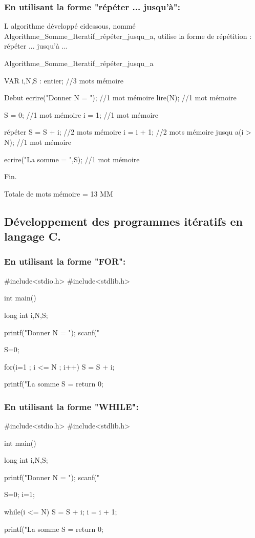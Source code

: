 \documentclass[•]{article}
\begin{document}
\subsubsection{En utilisant la forme "répéter ... jusqu'à":}
\textrm{L algorithme développé ci\-dessous, nommé Algorithme\_Somme\_Iteratif\_répéter\_jusqu\_a, utilise la forme de répétition : répéter ... jusqu'à ...}
\begin{sql}

  Algorithme_Somme_Iteratif_répéter_jusqu_a
 
 VAR
 i,N,S : entier;				//3 mots mémoire
 
 Debut
	ecrire("Donner N = ");		//1 mot mémoire
	lire(N);					//1 mot mémoire
	
	S = 0;						//1 mot mémoire
	i = 1;						//1 mot mémoire
	
	répéter
		S = S + i;				//2 mots mémoire
		i = i + 1;				//2 mots mémoire
	  jusqu a(i > N);			//1 mot mémoire
	  
	ecrire("La somme = ",S);	//1 mot mémoire
	
 Fin.
\end{sql}
\textrm{Totale de mots mémoire = 13 MM}

\subsection{Développement des programmes itératifs en langage C.}
\subsubsection{En utilisant la forme "FOR":}
\begin{sql}
 #include<stdio.h>
 #include<stdlib.h> 
 
 int main()
 {
	long int i,N,S;
	
	printf("Donner N = ");
	scanf("%
	
	S=0;
	
	for(i=1 ; i <= N ; i++)
	{
		S = S + i;
	}
	
	printf("La somme S = %
	return 0;
 }
\end{sql}

\subsubsection{En utilisant la forme "WHILE":}
\begin{sql}
 #include<stdio.h>
 #include<stdlib.h>
 
 int main()
 {
	long int i,N,S;
	
	printf("Donner N = ");
	scanf("%
	
	S=0; i=1;
	
	while(i <= N)
	{
		S = S + i;
		i = i + 1;
	}
	
	printf("La somme S = %
	return 0;
 }
\end{sql}
\end{document}
